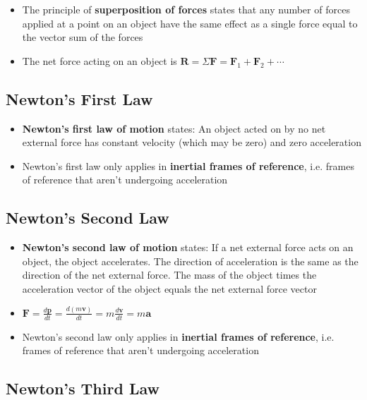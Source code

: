 \documentclass{article}
\begin{document}
\begin{itemize}
    \item The principle of \textbf{superposition of forces} states that any number of forces applied at a point on an object have the same effect as a single force equal to the vector sum of the forces

    \item The net force acting on an object is $\mathbf{R}=\Sigma\mathbf{F}=\mathbf{F}_1+\mathbf{F}_2+\cdots$
\end{itemize}

\subsection{Newton's First Law}

\begin{itemize}
    \item \textbf{Newton's first law of motion} states: An object acted on by no net external force has constant velocity (which may be zero) and zero acceleration

    \item Newton's first law only applies in \textbf{inertial frames of reference}, i.e. frames of reference that aren't undergoing acceleration
\end{itemize}

\subsection{Newton's Second Law}

\begin{itemize}
    \item \textbf{Newton's second law of motion} states: If a net external force acts on an object, the object accelerates. The direction of acceleration is the same as the direction of the net external force. The mass of the object times the acceleration vector of the object equals the net external force vector

    \item $\mathbf{F}=\frac{d\mathbf{p}}{dt}=\frac{d\left(m\mathbf{v}\right)}{dt}=m\frac{d\mathbf{v}}{dt}=m\mathbf{a}$

    \item Newton's second law only applies in \textbf{inertial frames of reference}, i.e. frames of reference that aren't undergoing acceleration
\end{itemize}

\subsection{Newton's Third Law}
\end{document}
